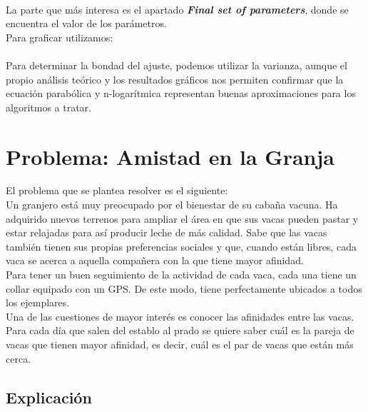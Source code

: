 \documentclass[a4paper,12pt,twoside]{article} %
\begin{document}
\\

La parte que más interesa es el apartado \textit{\textbf{Final set of parameters}}, donde se encuentra el valor de los parámetros.\\

Para graficar utilizamos:\\

\\

Para determinar la bondad del ajuste, podemos utilizar la varianza, aunque el propio análisis teórico y los resultados gráficos nos permiten confirmar que la ecuación parabólica y n-logarítmica representan buenas aproximaciones para los algoritmos a tratar.

\newpage


\section{Problema: Amistad en la Granja}

El problema que se plantea resolver es el siguiente:\\

Un granjero está muy preocupado por el bienestar de su cabaña vacuna. Ha adquirido nuevos terrenos para ampliar el área en que sus vacas pueden pastar y estar relajadas para así producir leche de más calidad. Sabe que las vacas también tienen sus propias preferencias sociales y que, cuando están
libres, cada vaca se acerca a aquella compañera con la que tiene mayor afinidad.\\

Para tener un buen seguimiento de la actividad de cada vaca, cada una tiene un collar equipado con un GPS. De este modo, tiene perfectamente ubicados a todos los ejemplares.\\

Una de las cuestiones de mayor interés es conocer las afinidades entre las vacas. Para cada día que salen del establo al prado se quiere saber cuál es la pareja de vacas que tienen mayor afinidad, es decir, cuál es el par de vacas que están más cerca.


\newpage

\subsection{Explicación}
\end{document}
